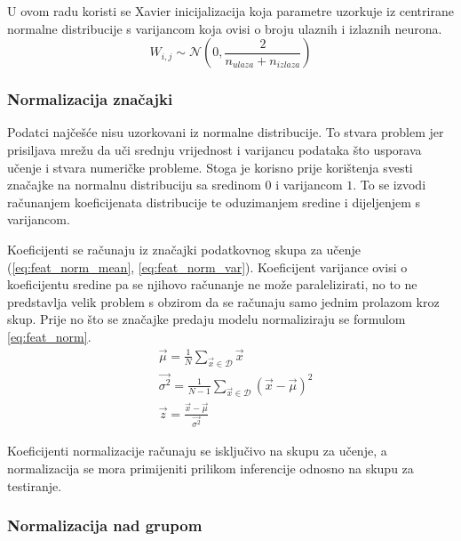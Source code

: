\documentclass[times, utf8, numeric, diplomski]{fer}
\def\normal{\mathcal{N}}
\def\dataset{\mathcal{D}}
\def\TODO#1{\noindent\textcolor{red}{TODO: \textit{#1}}\newline}
\def\todo#1{\TODO{#1}}
\begin{document}

U ovom radu koristi se Xavier inicijalizacija koja parametre uzorkuje iz centrirane normalne distribucije s varijancom koja ovisi o broju ulaznih i izlaznih neurona. \citep{xavier}
\begin{equation}
W_{i,j} \sim \normal(0, \frac{2}{n_{ulaza}+n_{izlaza}})
\end{equation}

\subsubsection{Normalizacija značajki}
Podatci najčešće nisu uzorkovani iz normalne distribucije. To stvara problem jer prisiljava mrežu da uči srednju vrijednost i varijancu podataka što usporava učenje i stvara numeričke probleme. Stoga je korisno prije korištenja svesti značajke na normalnu distribuciju sa sredinom $0$ i varijancom $1$. To se izvodi računanjem koeficijenata distribucije te oduzimanjem sredine i dijeljenjem s varijancom.

Koeficijenti se računaju iz značajki podatkovnog skupa za učenje (\ref{eq:feat_norm_mean}, \ref{eq:feat_norm_var}). Koeficijent varijance ovisi o koeficijentu sredine pa se njihovo računanje ne može paralelizirati, no to ne predstavlja velik problem s obzirom da se računaju samo jednim prolazom kroz skup. Prije no što se značajke predaju modelu normaliziraju se formulom \eqref{eq:feat_norm}.
\begin{align}
\label{eq:feat_norm_mean}
&\vec{\mu} = \frac{1}{N} \sum_{\vec{x}\in \dataset} \vec{x} \\
\label{eq:feat_norm_var}
&\vec{\sigma^2} = \frac{1}{N-1} \sum_{\vec{x}\in \dataset} (\vec{x}-\vec{\mu})^2 \\
\label{eq:feat_norm}
&\vec{z} = \frac{\vec{x} - \vec{\mu}}{\vec{\sigma^2}}
\end{align}

Koeficijenti normalizacije računaju se isključivo na skupu za učenje, a normalizacija se mora primijeniti prilikom inferencije odnosno na skupu za testiranje.

\subsubsection{Normalizacija nad grupom}
\end{document}
